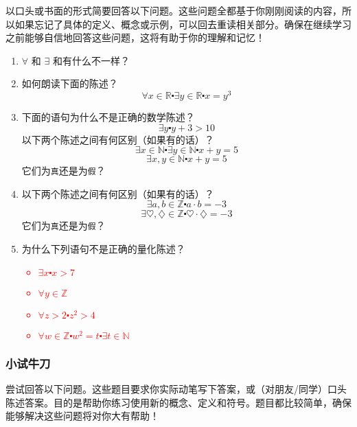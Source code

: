 以口头或书面的形式简要回答以下问题。这些问题全都基于你刚刚阅读的内容，所以如果忘记了具体的定义、概念或示例，可以回去重读相关部分。确保在继续学习之前能够自信地回答这些问题，这将有助于你的理解和记忆！

\begin{enumerate}[label=(\arabic*)]
    \item $\forall$ 和 $\exists$ 和有什么不一样？
    \item 如何朗读下面的陈述？
        \[\forall x \in \mathbb{R} \centerdot \exists y \in \mathbb{R} \centerdot x = y^3\]
    \item 下面的语句为什么不是正确的数学陈述？
        \[\exists y \centerdot y + 3 > 10\]
        以下两个陈述之间有何区别（如果有的话）？
        \[\exists x \in \mathbb{N} \centerdot ∃y \in \mathbb{N} \centerdot x + y = 5\]
        \[\exists x, y \in \mathbb{N} \centerdot x + y = 5\]
        它们为\verb|真|还是为\verb|假|？
    \item 以下两个陈述之间有何区别（如果有的话）？
        \[\exists a, b \in \mathbb{Z} \centerdot a \cdot b = -3\]
        \[\exists \heartsuit, \diamondsuit \in \mathbb{Z} \centerdot \heartsuit \cdot \diamondsuit = -3\]
        它们为\verb|真|还是为\verb|假|？
    \item 为什么下列语句不是正确的量化陈述？
        \textcolor{red}{\begin{itemize}
            \item $\exists x \centerdot x > 7$
            \item $\forall y \in \mathbb{Z}$
            \item $\forall z > 2 \centerdot z^2 > 4$
            \item $\forall w \in \mathbb{Z} \centerdot w^2 = t \centerdot \exists t \in \mathbb{N}$
        \end{itemize}}
\end{enumerate}

\subsubsection*{小试牛刀}

尝试回答以下问题。这些题目要求你实际动笔写下答案，或（对朋友/同学）口头陈述答案。目的是帮助你练习使用新的概念、定义和符号。题目都比较简单，确保能够解决这些问题将对你大有帮助！

